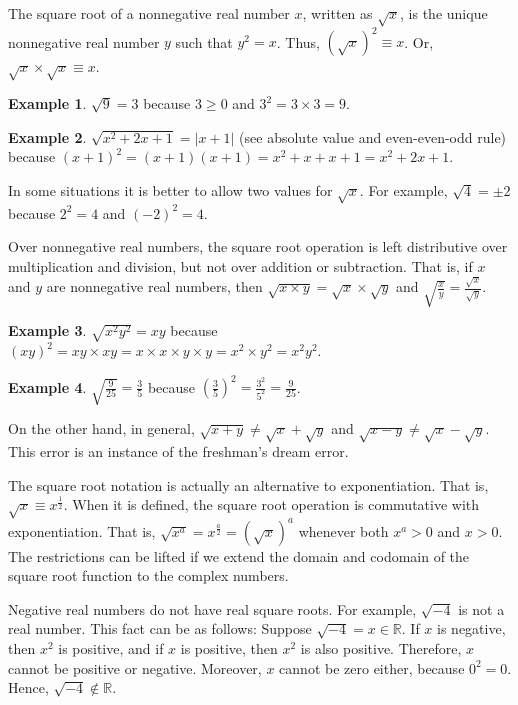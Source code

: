 \documentclass[12pt]{article}
\theoremstyle{definition}
\newtheorem*{ex*}{Example}
\begin{document}
The square root of a nonnegative real number $x$, written as $\sqrt{x}$, is the unique nonnegative real number $y$ such that $y^2=x$.  Thus, $(\sqrt{x})^2 \equiv x$.  Or, $\sqrt{x}\times\sqrt{x}\equiv x$.

\begin{ex*}
$\sqrt{9}=3$ because $3\geq 0$ and $3^2=3\times 3=9$.
\end{ex*}

\begin{ex*}
$\sqrt{x^2+2x+1}=\vert x+1\vert$ (see absolute value and even-even-odd rule) because $(x+1)^2=(x+1)(x+1)=x^2+x+x+1=x^2+2x+1$.
\end{ex*}

In some situations it is better to allow two values for $\sqrt{x}$.  For example, $\sqrt{4}=\pm 2$ because $2^2=4$ and $(-2)^2=4$.

Over nonnegative real numbers, the square root operation is left distributive over multiplication and division, but not over addition or subtraction.  That is, if $x$ and $y$ are nonnegative real numbers, then $\sqrt{x\times y}=\sqrt{x}\times\sqrt{y}$ and $\displaystyle \sqrt{\frac{x}{y}}=\frac{\sqrt{x}}{\sqrt{y}}$.

\begin{ex*}
$\sqrt{x^{2}y^{2}}=xy$ because $(xy)^2=xy\times xy=x\times x\times y\times y=x^2\times y^2=x^{2}y^{2}$.
\end{ex*}

\begin{ex*}
$\displaystyle \sqrt{\frac{9}{25}}=\frac{3}{5}$ because $\displaystyle\left(\frac{3}{5}\right)^2=\frac{3^2}{5^2}=\frac{9}{25}$.
\end{ex*}

On the other hand, in general, $\sqrt{x+y}\neq\sqrt{x}+\sqrt{y}$ and $\sqrt{x-y}\neq\sqrt{x}-\sqrt{y}$.  This error is an instance of the freshman's dream error.

The square root notation is actually an alternative to exponentiation.  That is, $\sqrt{x} \equiv x^\frac{1}{2}$.  When it is defined, the square root operation is commutative with exponentiation.  That is, $\sqrt{x^a}=x^\frac{a}{2}=(\sqrt{x})^a$ whenever both $x^a>0$ and $x>0$.  The restrictions can be lifted if we extend the domain and codomain of the square root function to the complex numbers.

Negative real numbers do not have real square roots.  For example, $\sqrt{-4}$ is not a real number.  This fact can be  as follows:  Suppose $\sqrt{-4}=x\in\mathbb{R}$.  If $x$ is negative, then $x^2$ is positive, and if $x$ is positive, then $x^2$ is also positive.  Therefore, $x$ cannot be positive or negative.  Moreover, $x$ cannot be zero either, because $0^2=0$.  Hence, $\sqrt{-4}\notin\mathbb{R}$.
\end{document}
